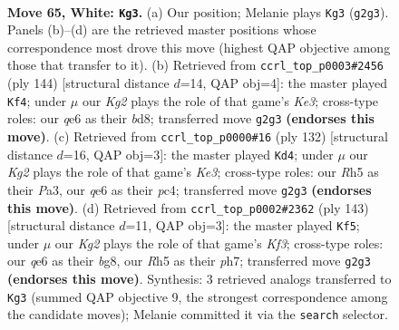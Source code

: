 \documentclass[11pt]{article}
\begin{document}
\clearpage

\begin{figure}[p]\centering
\begin{subfigure}{0.46\textwidth}\centering
\resizebox{\linewidth}{!}{%
\newchessgame
\chessboard[
  setfen={8/8/4q3/7R/1p6/b2k1B2/6K1/8 w - - 20 65},
  showmover=false,
  pgfstyle=straightmove, color=movearrow, markmove={g2-g3}
]}
\caption{}
\end{subfigure}\hfill
\begin{subfigure}{0.46\textwidth}\centering
\resizebox{\linewidth}{!}{%
\newchessgame
\chessboard[
  setfen={3b4/R7/2b1k3/8/3B4/4K3/8/8 w - - 21 73},
  showmover=false,
  pgfstyle=straightmove, color=movearrow, markmove={e3-f4}
]}
\caption{}
\end{subfigure}
\\[4pt]
\begin{subfigure}{0.46\textwidth}\centering
\resizebox{\linewidth}{!}{%
\newchessgame
\chessboard[
  setfen={8/1p3k2/2b5/8/2p3P1/P3K3/3B4/8 w - - 2 67},
  showmover=false,
  pgfstyle=straightmove, color=movearrow, markmove={e3-d4}
]}
\caption{}
\end{subfigure}\hfill
\begin{subfigure}{0.46\textwidth}\centering
\resizebox{\linewidth}{!}{%
\newchessgame
\chessboard[
  setfen={6B1/7P/5k2/4b2K/5p2/8/8/8 b - - 0 72},
  showmover=false,
  pgfstyle=straightmove, color=movearrow, markmove={f6-f5}
]}
\caption{}
\end{subfigure}
\caption{\textbf{Move 65, White: \texttt{Kg3}.} (a) Our position; Melanie plays \texttt{Kg3} (\texttt{g2g3}). Panels (b)--(d) are the retrieved master positions whose correspondence most drove this move (highest QAP objective among those that transfer to it). (b) Retrieved from \texttt{ccrl\_top\_p0003\#2456} (ply 144) [structural distance $d$=14, QAP obj=4]: the master played \texttt{Kf4}; under $\mu$ our \emph{Kg2} plays the role of that game's \emph{Ke3}; cross-type roles: our \emph{q}e6 as their \emph{b}d8; transferred move \texttt{g2g3} \textbf{(endorses this move)}. (c) Retrieved from \texttt{ccrl\_top\_p0000\#16} (ply 132) [structural distance $d$=16, QAP obj=3]: the master played \texttt{Kd4}; under $\mu$ our \emph{Kg2} plays the role of that game's \emph{Ke3}; cross-type roles: our \emph{R}h5 as their \emph{P}a3, our \emph{q}e6 as their \emph{p}c4; transferred move \texttt{g2g3} \textbf{(endorses this move)}. (d) Retrieved from \texttt{ccrl\_top\_p0002\#2362} (ply 143) [structural distance $d$=11, QAP obj=3]: the master played \texttt{Kf5}; under $\mu$ our \emph{Kg2} plays the role of that game's \emph{Kf3}; cross-type roles: our \emph{q}e6 as their \emph{b}g8, our \emph{R}h5 as their \emph{p}h7; transferred move \texttt{g2g3} \textbf{(endorses this move)}. Synthesis: 3 retrieved analogs transferred to \texttt{Kg3} (summed QAP objective 9, the strongest correspondence among the candidate moves); Melanie committed it via the \texttt{search} selector.}
\label{fig:thought-m128}
\end{figure}
\end{document}
